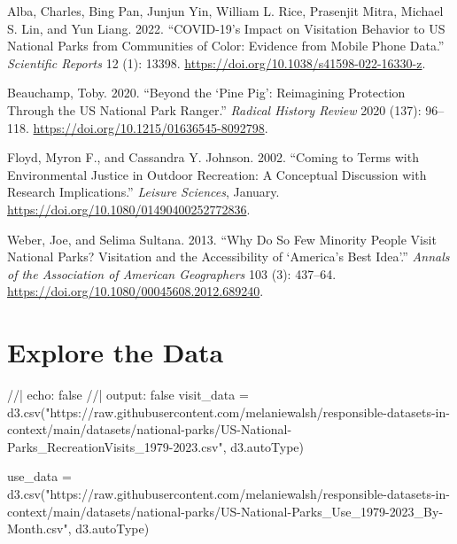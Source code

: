 \documentclass[
  letterpaper,
  DIV=11,
  numbers=noendperiod]{scrartcl}
\newenvironment{Shaded}{\begin{snugshade}}{\end{snugshade}}
\newcommand{\NormalTok}[1]{\textcolor[rgb]{0.00,0.23,0.31}{#1}}
\newlength{\cslhangindent}
\newenvironment{CSLReferences}[2] %
 {\begin{list}{}{%
  \setlength{\itemindent}{0pt}
  \setlength{\leftmargin}{0pt}
  \setlength{\parsep}{0pt}
  \ifodd #1
   \setlength{\leftmargin}{\cslhangindent}
   \setlength{\itemindent}{-1\cslhangindent}
  \fi
  \setlength{\itemsep}{#2\baselineskip}}}
 {\end{list}}
\begin{document}
\label{refs}
\begin{CSLReferences}{1}{0}
Alba, Charles, Bing Pan, Junjun Yin, William L. Rice, Prasenjit Mitra,
Michael S. Lin, and Yun Liang. 2022. {``{COVID}-19's Impact on
Visitation Behavior to {US} National Parks from Communities of Color:
Evidence from Mobile Phone Data.''} \emph{Scientific Reports} 12 (1):
13398. \url{https://doi.org/10.1038/s41598-022-16330-z}.

Beauchamp, Toby. 2020. {``Beyond the {`{Pine} {Pig}'}: {Reimagining}
{Protection} Through the {US} {National} {Park} {Ranger}.''}
\emph{Radical History Review} 2020 (137): 96--118.
\url{https://doi.org/10.1215/01636545-8092798}.

Floyd, Myron F., and Cassandra Y. Johnson. 2002. {``Coming to {Terms}
with {Environmental} {Justice} in {Outdoor} {Recreation}: {A}
{Conceptual} {Discussion} with {Research} {Implications}.''}
\emph{Leisure Sciences}, January.
\url{https://doi.org/10.1080/01490400252772836}.

Weber, Joe, and Selima Sultana. 2013. {``Why {Do} {So} {Few} {Minority}
{People} {Visit} {National} {Parks}? {Visitation} and the
{Accessibility} of {`{America}'s {Best} {Idea}'}.''} \emph{Annals of the
Association of American Geographers} 103 (3): 437--64.
\url{https://doi.org/10.1080/00045608.2012.689240}.

\end{CSLReferences}

\section{Explore the Data}\label{tabset-1-2}

\begin{Shaded}
\begin{Highlighting}[]
\NormalTok{//| echo: false}
\NormalTok{//| output: false}
\NormalTok{visit\_data = d3.csv("https://raw.githubusercontent.com/melaniewalsh/responsible{-}datasets{-}in{-}context/main/datasets/national{-}parks/US{-}National{-}Parks\_RecreationVisits\_1979{-}2023.csv", d3.autoType)}

\NormalTok{use\_data = d3.csv("https://raw.githubusercontent.com/melaniewalsh/responsible{-}datasets{-}in{-}context/main/datasets/national{-}parks/US{-}National{-}Parks\_Use\_1979{-}2023\_By{-}Month.csv", d3.autoType)}
\end{Highlighting}
\end{Shaded}
\end{document}
